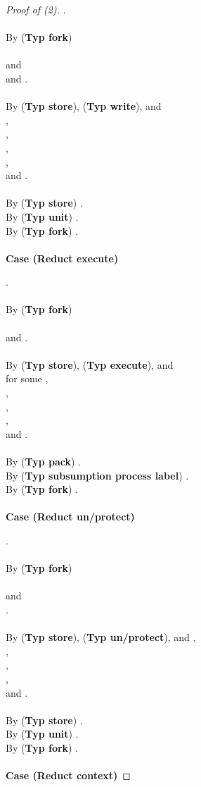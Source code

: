 \documentclass{sigplanconf}
\newcommand{\trule}[1]{(\textbf{Typ #1})}
\begin{document}
\begin{proof}[Proof of (2)]
.\\
\\
By \trule{fork}\\
  \\
 and \\
and .\\
\\
By \trule{store}, \trule{write}, and \\
 ,\\
 , \\
 , \\
 , \\
 and .\\
\\
By \trule{store} . \\
By \trule{unit} . \\
By \trule{fork} .\\
\\
{\bf Case (Reduct execute)}

.\\
\\
By \trule{fork}\\
  \\
 and .\\
\\
By \trule{store}, \trule{execute}, and \\
  for some ,\\
 ,\\
 ,\\
 ,\\
 and . \\
\\
By \trule{pack} .\\
By \trule{subsumption process label} .\\
By \trule{fork} .\\
\\
{\bf Case (Reduct un/protect)}

.\\
\\
By \trule{fork}\\
   \\
 and \\
 .\\
\\
By \trule{store}, \trule{un/protect}, and , \\
 ,\\
 , \\
 ,\\
 and . \\
\\
By \trule{store} .\\
By \trule{unit} .\\
By \trule{fork} .\\
\\
{\bf Case (Reduct context)}


\end{proof}
\end{document}
